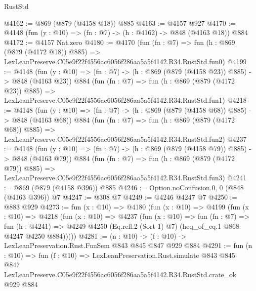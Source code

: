 \begin{lexlean}{RustStd}
\begin{coremodule}
@4162 := @869 (@879 (@4158 @18)) @885
@4163 := @4157 @927
@4170 := @4148 (fun (y : @10) => (fn : @7) -> (h : @4162) -> @848 (@4163 @18)) @884
@4172 := @4157 Nat.zero
@4180 := @4170
    (fun (fn : @7) =>
    fun (h : @869 (@879 (@4172 @18)) @885) =>
    LexLeanPreserve.C05e9f22f4556ac6056f286aa5a5f4142.R34.RustStd.fun0)
@4199 := @4148
    (fun (y : @10) => (fn : @7) -> (h : @869 (@879 (@4158 @23)) @885) -> @848 (@4163 @23))
    @884
    (fun (fn : @7) =>
    fun (h : @869 (@879 (@4172 @23)) @885) =>
    LexLeanPreserve.C05e9f22f4556ac6056f286aa5a5f4142.R34.RustStd.fun1)
@4218 := @4148
    (fun (y : @10) => (fn : @7) -> (h : @869 (@879 (@4158 @68)) @885) -> @848 (@4163 @68))
    @884
    (fun (fn : @7) =>
    fun (h : @869 (@879 (@4172 @68)) @885) =>
    LexLeanPreserve.C05e9f22f4556ac6056f286aa5a5f4142.R34.RustStd.fun2)
@4237 := @4148
    (fun (y : @10) => (fn : @7) -> (h : @869 (@879 (@4158 @79)) @885) -> @848 (@4163 @79))
    @884
    (fun (fn : @7) =>
    fun (h : @869 (@879 (@4172 @79)) @885) =>
    LexLeanPreserve.C05e9f22f4556ac6056f286aa5a5f4142.R34.RustStd.fun3)
@4241 := @869 (@879 (@4158 @396)) @885
@4246 := Option.noConfusion.{0, 0} (@848 (@4163 @396)) @7
@4247 := @308 @7
@4249 := @4246 @4247 @7
@4250 := @883 @929
@4273 := fun (x : @10) =>
  @4180
    (fun (x : @10) =>
    @4199
      (fun (x : @10) =>
      @4218
        (fun (x : @10) =>
        @4237
          (fun (x : @10) =>
          fun (fn : @7) =>
          fun (h : @4241) =>
          @4249 @4250 (Eq.refl.{2} (Sort 1) @7) (heq_of_eq.{1} @868 @4247 @4250 @884)))))
@4281 := (n : @10) -> (f : @10) -> LexLeanPreservation.Rust.FunSem @843 @845 @847 @929 @884
@4291 := fun (n : @10) =>
  fun (f : @10) =>
  LexLeanPreservation.Rust.simulate
    @843
    @845
    @847
    LexLeanPreserve.C05e9f22f4556ac6056f286aa5a5f4142.R34.RustStd.crate_ok
    @929
    @884
\end{coremodule}
\end{lexlean}
